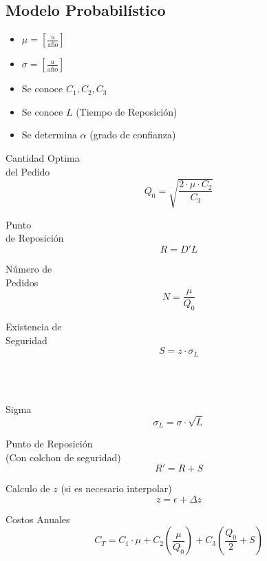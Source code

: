 \documentclass[10pt,letterpaper]{article}
\begin{document}
\subsection{Modelo Probabilístico}
\begin{itemize}
\item $\mu = [\frac{u}{\text{año}}]$
\item $\sigma = [\frac{u}{\text{año}}]$
\item Se conoce $C_1,C_2,C_3$
\item Se conoce $L$ (Tiempo de Reposición)
\item Se determina $\alpha$ (grado de confianza)
\end{itemize}
\begin{enumerate}
\noindent
\begin{minipage}[t]{.25\textwidth}
\raggedright
\item Cantidad Optima \\ del Pedido
$$
Q_0 = \sqrt{\dfrac{2 \cdot  \mu  \cdot  C_2}{C_3}}
$$
\end{minipage}%
\begin{minipage}[t]{.25\textwidth}
\raggedright
\item Punto \\ de Reposición
$$
R = D' L
$$
\end{minipage}%
\begin{minipage}[t]{.25\textwidth}
\raggedright
\item Número de\\ Pedidos
$$
N=\dfrac{\mu}{Q_0}
$$
\end{minipage}%
\begin{minipage}[t]{.25\textwidth}
\raggedright
\item Existencia de\\ Seguridad
$$
S = z \cdot \sigma_L
$$
\end{minipage}
\\${ }$\\
\begin{minipage}[t]{.33\textwidth}
\raggedright
\item Sigma
$$
\sigma_L = \sigma \cdot \sqrt{L}
$$
\end{minipage}%
\begin{minipage}[t]{.33\textwidth}
\raggedright
\item Punto de Reposición \\ (Con colchon de seguridad)
$$
R'=R+S
$$
\end{minipage}%
\begin{minipage}[t]{.33\textwidth}
\raggedright
\item Calculo de $z$ (si es necesario interpolar)
$$
z = \epsilon + \Delta z
$$
\end{minipage}
\item Costos Anuales
$$
C_T = C_1 \cdot\mu + C_2 \left( \dfrac{\mu}{Q_0}\right) + C_3 \left( \dfrac{Q_0}{2}+S \right)
$$
\end{enumerate}
\end{document}
